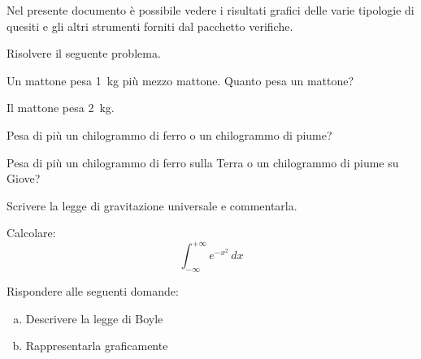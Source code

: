 \documentclass[a4paper, 10pt]{extarticle}
\begin{document}

\printheading

\pagestyle{verifiche}

Nel presente documento è possibile vedere i risultati grafici delle varie tipologie di quesiti e gli altri strumenti forniti dal pacchetto \textsf{verifiche}. 

\begin{esercizio}
Risolvere il seguente problema.

Un mattone pesa \SI{1}{kg} più mezzo mattone. Quanto pesa un mattone?
\end{esercizio}

\begin{soluzione}
Il mattone pesa \SI{2}{kg}.
\end{soluzione}

\begin{esercizio}[pt=2]\label{es:ferropiuma}%
Pesa di più un chilogrammo di ferro o un chilogrammo di piume?
\end{esercizio}

\begin{esercizio}[diff=1]
Pesa di più un chilogrammo di ferro sulla Terra o un chilogrammo di piume su Giove?
\end{esercizio}

\renewcommand{\diffsymb}{$\bigstar$}
\begin{esercizio}[diff=2, pt=5]\label{es:grav}%
Scrivere la legge di gravitazione universale e commentarla.
\end{esercizio}

\begin{esercizio}[label=Esercizio]
Calcolare:
\[
\int_{-\infty}^{+\infty} e^{-x^2}\, dx
\]
\end{esercizio}

\begin{esercizio}
Rispondere alle seguenti domande:
\begin{enumerate}[(a)]
\item {} Descrivere la legge di Boyle
\item {} Rappresentarla graficamente
\end{enumerate}
\end{esercizio}
\end{document}
